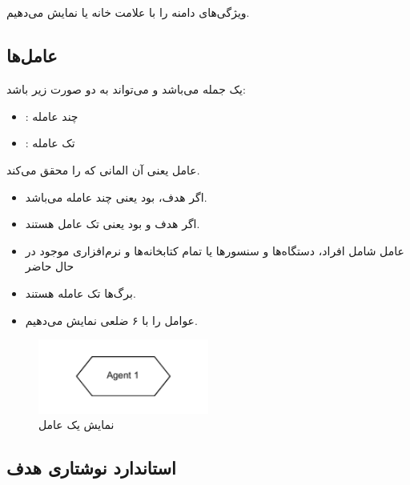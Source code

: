 \subsection{}

ویژگی‌های دامنه را با علامت خانه یا  نمایش می‌دهیم.

\subsection{عامل‌ها}

 یک جمله می‌باشد و می‌تواند به دو صورت زیر باشد:

\begin{itemize}
    \item {}: چند عامله
    \item {}: تک عامله
\end{itemize}

عامل یعنی آن المانی که  را محقق می‌کند.

\begin{itemize}
    \item اگر هدف،  بود یعنی چند عامله می‌باشد.
    \item اگر هدف  و  بود یعنی تک
    عامل هستند.
\end{itemize}

\begin{itemize}
    \item عامل شامل افراد، دستگاه‌ها و سنسور‌ها یا تمام کتابخانه‌ها و نرم‌افزاری
    موجود در حال حاضر
    \item برگ‌ها تک عامله هستند.
    \item عوامل را با ۶ ضلعی نمایش می‌دهیم.
\end{itemize}

\begin{figure}[H]
    \centering
    \includegraphics[width=0.5\textwidth]{assets/agent.drawio.pdf}
    \caption{نمایش یک عامل}
\end{figure}

\subsection{استاندارد نوشتاری هدف}

